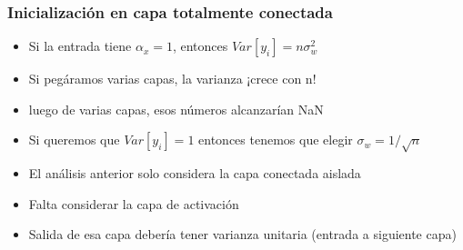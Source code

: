 \documentclass[svgnames,12pt,aspectratio=149]{beamer}
\begin{document}
\begin{frame}
  \frametitle{Inicialización en capa totalmente conectada}
\begin{itemize}
\item Si la entrada tiene $\alpha_x=1$, entonces $Var[y_i]=n\sigma^2_w$
\item Si pegáramos varias capas, la varianza ¡crece con n!
\item luego de varias capas, esos números alcanzarían NaN
\item Si queremos que $Var[y_i]=1$ entonces tenemos que elegir $\sigma_w=1/\sqrt{n}$
\item El análisis anterior solo considera la capa conectada  aislada
\item Falta considerar la capa de activación 
\item Salida de esa capa debería tener varianza unitaria (entrada a siguiente capa)
\end{itemize}

\end{frame}
\end{document}
